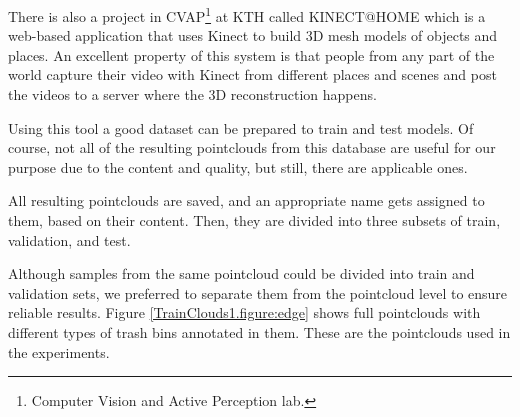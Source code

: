 There is also a project in CVAP\footnote{Computer Vision and Active Perception lab.} at KTH called KINECT@HOME \cite{aydemir2012kinect} which is a web-based application that uses Kinect to build 3D mesh models of objects and places. 
An excellent property of this system is that people from any part of the world capture their video with Kinect from different places and scenes and post the videos to a server where the 3D reconstruction happens. 

Using this tool a good dataset can be prepared to train and test models.
Of course, not all of the resulting pointclouds from this database are useful for our purpose due to the content and
quality, but still, there are applicable ones.


All resulting pointclouds are saved, and an appropriate name gets assigned to them, based on their content.  
Then, they are divided into three subsets of train, validation, and test. 

Although samples from the same pointcloud could be divided into train and validation sets, we preferred to separate them from the pointcloud level to ensure reliable results. 
Figure \ref{TrainClouds1.figure:edge} shows full pointclouds with different types of trash bins annotated in them. 
These are the pointclouds used in the experiments.



